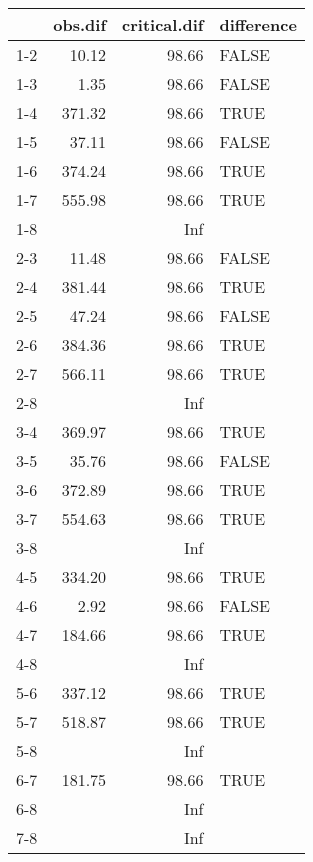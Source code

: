 \begin{table}[ht]
\centering
\begin{tabular}{rrrl}
  \hline
 & obs.dif & critical.dif & difference \\ 
  \hline
1-2 & 10.12 & 98.66 & FALSE \\ 
  1-3 & 1.35 & 98.66 & FALSE \\ 
  1-4 & 371.32 & 98.66 & TRUE \\ 
  1-5 & 37.11 & 98.66 & FALSE \\ 
  1-6 & 374.24 & 98.66 & TRUE \\ 
  1-7 & 555.98 & 98.66 & TRUE \\ 
  1-8 &  & Inf &  \\ 
  2-3 & 11.48 & 98.66 & FALSE \\ 
  2-4 & 381.44 & 98.66 & TRUE \\ 
  2-5 & 47.24 & 98.66 & FALSE \\ 
  2-6 & 384.36 & 98.66 & TRUE \\ 
  2-7 & 566.11 & 98.66 & TRUE \\ 
  2-8 &  & Inf &  \\ 
  3-4 & 369.97 & 98.66 & TRUE \\ 
  3-5 & 35.76 & 98.66 & FALSE \\ 
  3-6 & 372.89 & 98.66 & TRUE \\ 
  3-7 & 554.63 & 98.66 & TRUE \\ 
  3-8 &  & Inf &  \\ 
  4-5 & 334.20 & 98.66 & TRUE \\ 
  4-6 & 2.92 & 98.66 & FALSE \\ 
  4-7 & 184.66 & 98.66 & TRUE \\ 
  4-8 &  & Inf &  \\ 
  5-6 & 337.12 & 98.66 & TRUE \\ 
  5-7 & 518.87 & 98.66 & TRUE \\ 
  5-8 &  & Inf &  \\ 
  6-7 & 181.75 & 98.66 & TRUE \\ 
  6-8 &  & Inf &  \\ 
  7-8 &  & Inf &  \\ 
   \hline
\end{tabular}
\end{table}
